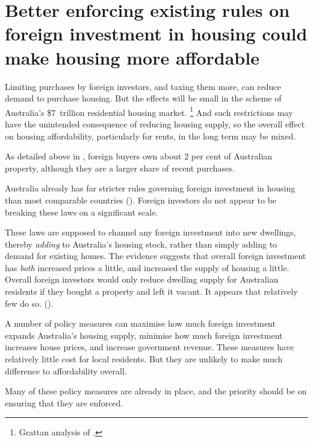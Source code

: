 \section{Better enforcing existing rules on foreign investment in housing could make housing more affordable}\label{sec:better-enforcing-existing-rules-on-foreign-investment-in-housing-could-make-housing-more-affordable}

Limiting purchases by foreign investors, and taxing them more, can reduce demand to purchase housing.
But the effects will be small in the scheme of Australia's \$7~trillion residential housing market.%
	\footnote{Grattan analysis of \textcite[][Tables~10 and~61]{ABS-aus-system-of-nat-accounts2016-17}.}
And such restrictions may have the unintended consequence of reducing housing supply, so the overall effect on housing affordability, particularly for rents, in the long term may be mixed.

As detailed above in , foreign buyers own about 2 per cent of Australian property, although they are a larger share of recent purchases.

Australia already has far stricter rules governing foreign investment in housing than most comparable countries ().
Foreign investors do not appear to be breaking these laws on a significant scale.

These laws are supposed to channel any foreign investment into new dwellings, thereby \emph{adding} to Australia's housing stock, rather than simply adding to demand for existing homes. The evidence suggests that overall foreign investment has \emph{both} increased prices a little, and increased the supply of housing a little. Overall foreign investors would only reduce dwelling supply for Australian residents if they bought a property and left it vacant. It appears that relatively few do so. ().

A number of policy measures can maximise how much foreign investment expands Australia's housing supply, minimise how much foreign investment increases house prices, and increase government revenue. These measures have relatively little cost for local residents. But they are unlikely to make much difference to affordability overall.

Many of these policy measures are already in place, and the priority should be on ensuring that they are enforced.

